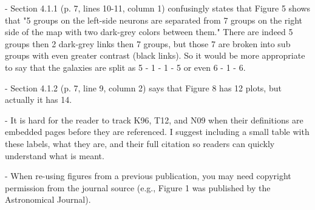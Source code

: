 - Section 4.1.1 (p. 7, lines 10-11, column 1) confusingly states that Figure 5 shows that "5 groups on the left-side neurons are separated from 7 groups on the right side of the map with two dark-grey colors between them."  There are indeed 5 groups then 2 dark-grey links then 7 groups, but those 7 are broken into sub groups with even greater contrast (black links).  So it would be more appropriate to say that the galaxies are split as 5 - 1 - 1 - 5 or even 6 - 1 - 6.

- Section 4.1.2 (p. 7, line 9, column 2) says that Figure 8 has 12 plots, but actually it has 14.

- It is hard for the reader to track K96, T12, and N09 when their definitions are embedded pages before they are referenced.  I suggest including a small table with these labels, what they are, and their full citation so readers can quickly understand what is meant.

- When re-using figures from a previous publication, you may need copyright permission from the journal source (e.g., Figure 1 was published by the Astronomical Journal).